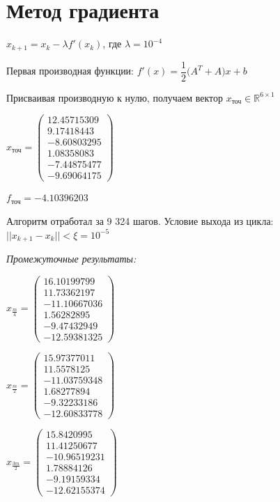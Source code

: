\documentclass[a4paper, 14pt]{extarticle}
\begin{document}
	\section{Метод градиента}
		$x_{k+1} = x_k - \lambda f'(x_k)$, где $\lambda = 10^{-4}$
		
		Первая производная функции: $ f'(x) = \dfrac{1}{2}\big(A^T + A\big)x + b $
		
		Присваивая производную к нулю, получаем вектор $x_{\text{точ}} \in \mathbb{R}^{6\times1}$
		
		$x_{\text{точ}} = \begin{pmatrix}
			12.45715309\\
			 9.17418443\\
			-8.60803295\\
			 1.08358083\\
			-7.44875477\\
			-9.69064175
		\end{pmatrix}$
	
		$f_{\text{точ}} = -4.10396203$
		
		 Алгоритм отработал за 9 324 шагов. Условие выхода из цикла: $ || x_{k+1} - x_k || < \xi = 10^{-5} $
		 
		\textit{Промежуточные результаты:}
		 
		 $x_{\frac{m}{4}} = \begin{pmatrix}
		 	16.10199799\\
		 	 11.73362197\\
		 	-11.10667036\\
		 	  1.56282895\\
		 	 -9.47432949\\
		 	-12.59381325
		 \end{pmatrix} $
	 
		 $x_{\frac{m}{2}} = \begin{pmatrix}
		 	15.97377011\\
		 	11.5578125\\
		 	-11.03759348\\
		 	1.68277894\\
		 	-9.32233186\\
		 	-12.60833778
		 \end{pmatrix} $
	 
	 $x_{\frac{3m}{2}} = \begin{pmatrix}
	 	 15.8420995 \\
	 	 11.41250677\\
	 	-10.96519231\\
	 	  1.78884126\\
	 	 -9.19159334\\
	 	-12.62155374
	 \end{pmatrix} $
 
\end{document}
